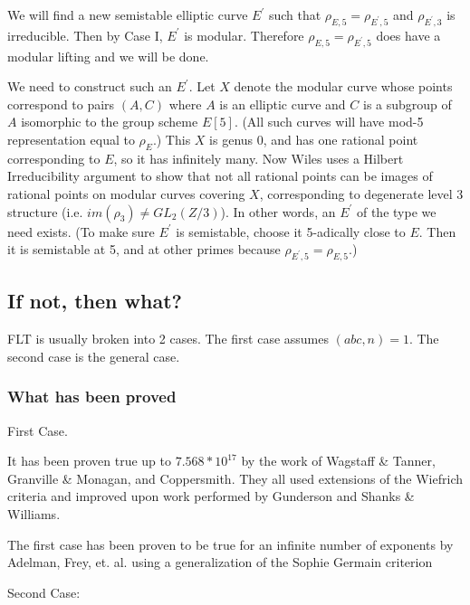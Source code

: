 {\begin{itemize}
    We will find a new semistable elliptic curve $E^\prime$ such that
    $\rho_{E,5} = \rho_{E^\prime,5}$ and $\rho_{E^\prime,3}$ is 
    irreducible.  Then by Case I, $E^\prime$ is modular.
     Therefore $\rho_{E,5}= \rho_{E^\prime,5}$
    does have a modular lifting and we will be done.
    
    We need to construct such an $E^\prime$.  Let $X$ denote the modular
    curve whose points correspond to pairs $(A, C)$ where $A$ is an
    elliptic curve and $C$ is a subgroup of $A$ isomorphic to the group
    scheme $E[5]$.  (All such curves will have mod-5 representation
    equal to $\rho_E$.)  This $X$ is genus 0, and has one rational point
    corresponding to $E$, so it has infinitely many.  Now Wiles uses a
    Hilbert Irreducibility argument to show that not all rational
    points can be images of rational points on modular curves
    covering $X$, corresponding to degenerate level 3 structure
    (i.e. $im(\rho_3) \neq GL_2(Z/3)$).  In other words, an $E^\prime$ of the
    type we need exists.  (To make sure $E^\prime$ is semistable, choose
    it 5-adically close to $E$.  Then it is semistable at 5, and at
    other primes because $\rho_{E^\prime,5} = \rho_{E,5}$.)
    
\end{itemize}

\subsection{If not, then what?}

    FLT is usually broken into 2 cases. The first case assumes
    $(abc,n) = 1$. The second case is the general case.

    \subsubsection{What has been proved}
   

    First Case.

    It has been proven true up to $7.568*10^{17}$ by the work of Wagstaff \&
    Tanner, Granville \& Monagan, and Coppersmith. They all used extensions
    of the Wiefrich criteria and improved upon work performed by
    Gunderson and Shanks \& Williams.

    The first case has been proven to be true for an infinite number of
    exponents by Adelman, Frey, et. al. using a generalization of the
    Sophie Germain criterion


    \noindent Second Case:

}
